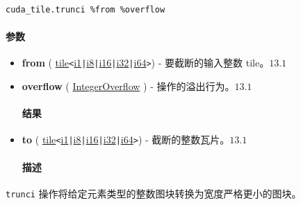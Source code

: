 \documentclass{article}
\begin{document}
\begin{lstlisting}
cuda_tile.trunci %from %overflow
\end{lstlisting}

\paragraph{参数}

\begin{itemize}
\item \textbf{from} ( \href{https://docs.nvidia.com/cuda/tile-ir/latest/sections/types.html#type-tile}{tile}\texttt{<}\href{https://docs.nvidia.com/cuda/tile-ir/latest/sections/types.html#subsection-element-types}{i1}\texttt{|}\href{https://docs.nvidia.com/cuda/tile-ir/latest/sections/types.html#subsection-element-types}{i8}\texttt{|}\href{https://docs.nvidia.com/cuda/tile-ir/latest/sections/types.html#subsection-element-types}{i16}\texttt{|}\href{https://docs.nvidia.com/cuda/tile-ir/latest/sections/types.html#subsection-element-types}{i32}\texttt{|}\href{https://docs.nvidia.com/cuda/tile-ir/latest/sections/types.html#subsection-element-types}{i64}\texttt{>}) - 要截断的输入整数 tile。$\boxed{13.1}$
\item \textbf{overflow} ( \href{https://docs.nvidia.com/cuda/tile-ir/latest/sections/operations.html#op-attribute-cuda-tile-trunci-integeroverflow-attr}{IntegerOverflow} ) - 操作的溢出行为。$\boxed{13.1}$


\paragraph{结果}

\item \textbf{to} ( \href{https://docs.nvidia.com/cuda/tile-ir/latest/sections/types.html#type-tile}{tile}\texttt{<}\href{https://docs.nvidia.com/cuda/tile-ir/latest/sections/types.html#subsection-element-types}{i1}\texttt{|}\href{https://docs.nvidia.com/cuda/tile-ir/latest/sections/types.html#subsection-element-types}{i8}\texttt{|}\href{https://docs.nvidia.com/cuda/tile-ir/latest/sections/types.html#subsection-element-types}{i16}\texttt{|}\href{https://docs.nvidia.com/cuda/tile-ir/latest/sections/types.html#subsection-element-types}{i32}\texttt{|}\href{https://docs.nvidia.com/cuda/tile-ir/latest/sections/types.html#subsection-element-types}{i64}\texttt{>}) - 截断的整数瓦片。$\boxed{13.1}$


\paragraph{描述}

\end{itemize}
\texttt{trunci} 操作将给定元素类型的整数图块转换为宽度严格更小的图块。
\end{document}
